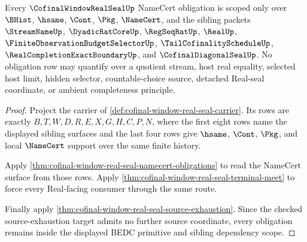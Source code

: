 \begin{theorem}
\label{thm:cofinal-window-real-seal-obligation-scope}
Every $\CofinalWindowRealSealUp$ NameCert obligation is scoped only over $\BHist$, $\hsame$, $\Cont$, $\Pkg$, $\NameCert$, and the sibling packets $\StreamNameUp$, $\DyadicRatCoreUp$, $\RegSeqRatUp$, $\RealUp$, $\FiniteObservationBudgetSelectorUp$, $\TailCofinalityScheduleUp$, $\RealCompletionExactBoundaryUp$, and $\CofinalDiagonalSealUp$. No obligation row may quantify over a quotient stream, host real equality, selected host limit, hidden selector, countable-choice source, detached Real-seal coordinate, or ambient completeness principle.
\end{theorem}
\begin{proof}
Project the carrier of \autoref{def:cofinal-window-real-seal-carrier}. Its rows are exactly $B,T,W,D,R,E,X,G,H,C,P,N$, where the first eight rows name the displayed sibling surfaces and the last four rows give $\hsame$, $\Cont$, $\Pkg$, and local $\NameCert$ support over the same finite history.

Apply \autoref{thm:cofinal-window-real-seal-namecert-obligations} to read the NameCert surface from those rows. Apply \autoref{thm:cofinal-window-real-seal-terminal-meet} to force every Real-facing consumer through the same route.

Finally apply \autoref{thm:cofinal-window-real-seal-source-exhaustion}. Since the checked source-exhaustion target admits no further source coordinate, every obligation remains inside the displayed BEDC primitive and sibling dependency scope.
\end{proof}

